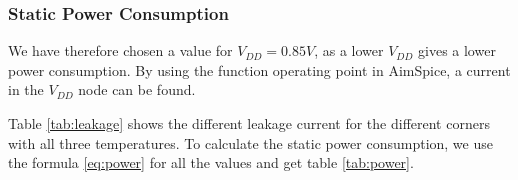 \subsubsection{Static Power Consumption}

We have therefore chosen a value for $V_{DD} = 0.85V$, as a lower $V_{DD}$ gives a lower power consumption. By using the function operating point in AimSpice, a current in the $V_{DD}$ node can be found.

Table \ref{tab:leakage} shows the different leakage current for the different corners with all three temperatures. To calculate the static power consumption, we use the formula \ref{eq:power} for all the values and get table \ref{tab:power}.

\begin{table}[H]
\centering
\caption{Leakage Current}
\label{tab:leakage}
\end{table}

